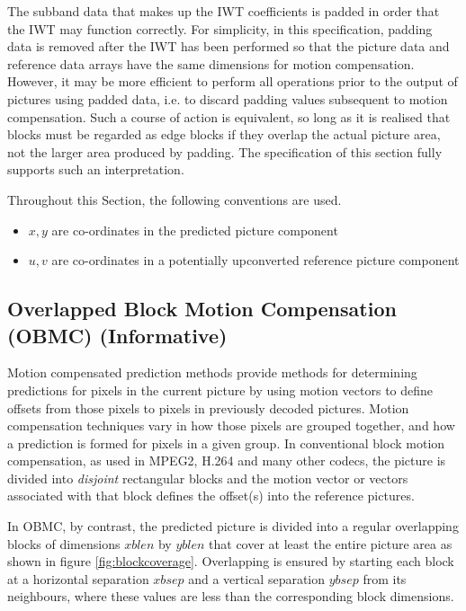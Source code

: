 \begin{informative}
The subband data that makes up the IWT coefficients is padded in order that the IWT
may function correctly. For simplicity, in this specification, padding data is removed
after the IWT has been performed so that the picture data and reference data arrays have
the same dimensions for motion compensation. However, it may be more efficient to perform
all operations prior to the output of pictures using padded data, i.e. to discard padding values
subsequent to motion compensation. Such a course of action is equivalent, so long as it is realised
that blocks must be regarded as edge blocks if they overlap the actual picture area, not the
larger area produced by padding. The specification of this section fully supports such an 
interpretation.
\end{informative}

Throughout this Section, the following conventions are used.

\begin{itemize}
\item $x,y$ are co-ordinates in the predicted picture component
\item $u,v$ are co-ordinates in a potentially upconverted reference picture component
\end{itemize}

\begin{comment}
[Are they??]
\end{comment}

\begin{informative*}
\subsection{Overlapped Block Motion Compensation (OBMC) (Informative)}

Motion compensated prediction methods provide methods for determining 
predictions for pixels in the current picture by using motion vectors to 
define offsets from those pixels to pixels in previously decoded
pictures. Motion compensation techniques vary in how those pixels are grouped
together, and how a prediction is formed for pixels in a given group. In 
conventional  block motion compensation, as used in MPEG2, H.264 and many other
codecs, the picture is divided into {\em disjoint} rectangular blocks and the
motion vector or vectors associated with that block defines the offset(s) into
the reference pictures.

In OBMC, by contrast, the predicted picture is divided into a regular overlapping 
blocks of dimensions $xblen$ by $yblen$ that cover at least the entire picture 
area as shown in figure \ref{fig:blockcoverage}.  Overlapping is ensured by starting
each block at a horizontal separation $xbsep$ and a vertical separation $ybsep$ 
from its neighbours, where these values are less than the corresponding block dimensions.
\end{informative*}


